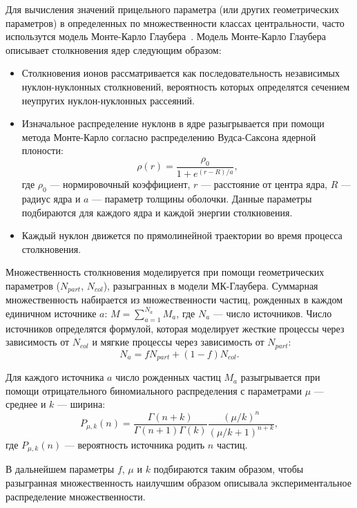 Для вычисления значений прицельного параметра (или других геометрических параметров) в определенных по множественности классах центральности, часто использутся модель Монте-Карло Глаубера~\cite{Miller:2007ri}.
Модель Монте-Карло Глаубера описывает столкновения ядер следующим образом:
\begin{itemize}
    \item Столкновения ионов рассматривается как последовательность независимых нуклон-нуклонных столкновений, вероятность которых определятся сечением неупругих нуклон-нуклонных рассеяний.
    \item Изначальное распределение нуклонв в ядре разыгрывается при помощи метода Монте-Карло согласно распределению Вудса-Саксона ядерной плоности:
    \begin{equation}
        \rho(r) = \frac{ \rho_0 }{ 1 + e^{ (r-R)/a } },
        \label{ eq:woods_saxon }
    \end{equation}
    где $\rho_0$ --- нормировочный коэффициент, $r$ --- расстояние от центра ядра, $R$ --- радиус ядра и $a$ --- параметр толщины оболочки.
    Данные параметры подбираются для каждого ядра и каждой энергии столкновения.
    \item Каждый нуклон движется по прямолинейной траектории во время процесса столкновения.
\end{itemize}

Множественность столкновения моделируется при помощи геометрических параметров ($N_{part}$, $N_{col}$), разыгранных в модели МК-Глаубера.
Суммарная множественность набирается из множественности частиц, рожденных в каждом единичном источнике $a$: $M=\sum_{a=1}^{N_a} M_a$, где $N_a$ --- число источников.
Число источников определятся формулой, которая моделирует жесткие процессы через зависимость от $N_{col}$ и мягкие процессы через зависимость от $N_{part}$:
\begin{equation}
    N_a = f N_{part} + (1-f) N_{col}.
\end{equation}

Для каждого источника $a$ число рожденных частиц $M_a$ разыгрывается при помощи отрицательного биномиального распределения с параметрами $\mu$ --- среднее и $k$ --- ширина:
\begin{equation}
    P_{\mu,k}(n) = \frac{ \Gamma (n+k) }{ \Gamma(n+1) \Gamma(k) } \frac{ (\mu/k)^n }{ (\mu/k+1)^{n+k} },
\end{equation}
где $P_{\mu,k}(n)$ --- вероятность источника родить $n$ частиц.

В дальнейшем параметры $f$, $\mu$ и $k$ подбираются таким образом, чтобы разыгранная множественность наилучшим образом описывала экспериментальное распределение множественности.

